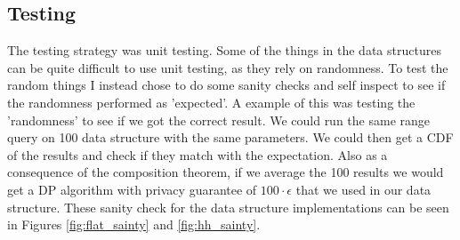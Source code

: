\documentclass[11pt]{article}
\theoremstyle{definition}
\begin{document}
\subsection{Testing}
The testing strategy was unit testing. Some of the things in the data structures can be quite difficult to use unit testing, as they rely on randomness. To test the random things I instead chose to do some sanity checks and self inspect to see if the randomness performed as 'expected'. A example of this was testing the 'randomness' to see if we got the correct result. We could run the same range query on 100 data structure with the same parameters. We could then get a CDF of the results and check if they match with the expectation. Also as a consequence of the composition theorem, if we average the 100 results we would get a DP algorithm with privacy guarantee of $100\cdot\epsilon$ that we used in our data structure. These sanity check for the data structure implementations can be seen in Figures \ref{fig:flat_sainty} and \ref{fig:hh_sainty}.
\end{document}
